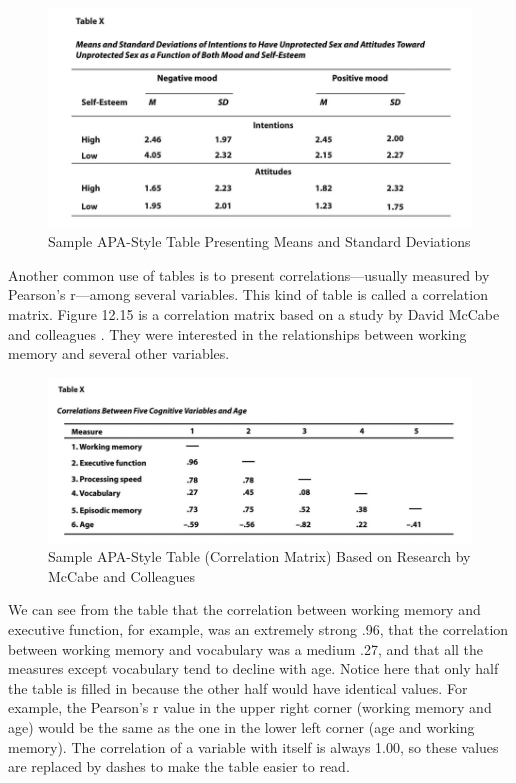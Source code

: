 \begin{figure}
\includegraphics[width=\linewidth]{figures/Fig12-14}
\caption{Sample APA-Style Table Presenting Means and Standard Deviations}
\label{fig:apatable}
\end{figure}


Another common use of tables is to present correlations---usually measured by Pearson's r---among several variables. This kind of table is called a correlation matrix. Figure 12.15 is a correlation matrix based on a study by David McCabe and colleagues \citep{mccabe_relationship_2010}. They were interested in the relationships between working memory and several other variables. 

\begin{figure}
\includegraphics[width=\linewidth]{figures/Fig12-15}
\caption{Sample APA-Style Table (Correlation Matrix) Based on Research by McCabe and Colleagues}
\label{fig:cormat}
\end{figure}

We can see from the table that the correlation between working memory and executive function, for example, was an extremely strong .96, that the correlation between working memory and vocabulary was a medium .27, and that all the measures except vocabulary tend to decline with age. Notice here that only half the table is filled in because the other half would have identical values. For example, the Pearson's r value in the upper right corner (working memory and age) would be the same as the one in the lower left corner (age and working memory). The correlation of a variable with itself is always 1.00, so these values are replaced by dashes to make the table easier to read.


